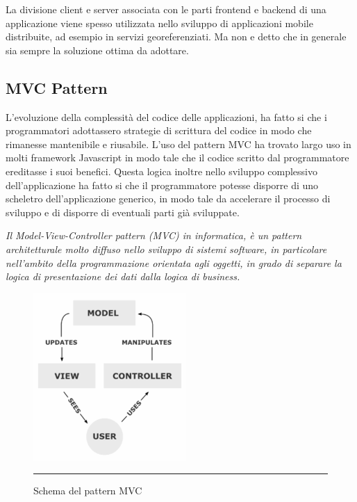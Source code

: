 La divisione client e server associata con le parti frontend e backend di una applicazione viene spesso utilizzata nello sviluppo di applicazioni mobile distribuite, ad esempio in servizi georeferenziati. Ma non e detto che in generale sia sempre la soluzione ottima da adottare. 

\subsection{MVC Pattern}
\label{sec:MVC}

L'evoluzione della complessità del codice delle applicazioni, ha fatto si che i programmatori adottassero strategie di scrittura del codice in modo che rimanesse mantenibile e riusabile. L'uso del pattern MVC ha trovato largo uso in molti framework Javascript in modo tale che il codice scritto dal programmatore ereditasse i suoi benefici. Questa logica inoltre nello sviluppo complessivo dell'applicazione ha fatto si che il programmatore potesse disporre di uno scheletro dell'applicazione generico, in modo tale da accelerare il processo di sviluppo e di disporre di eventuali parti già sviluppate.

\emph{Il Model-View-Controller pattern (MVC) in informatica, è un pattern architetturale molto diffuso nello sviluppo di sistemi software, in particolare nell'ambito della programmazione orientata agli oggetti, in grado di separare la logica di presentazione dei dati dalla logica di business.}

\begin{figure}[htbp]
  \centering
    \includegraphics[scale=0.75]{Figures/mvc.png}  
    \rule{35em}{0.5pt}
  \caption[MVC Pattern]{Schema del pattern MVC}
  \label{fig:MVC Schema}
\end{figure}

